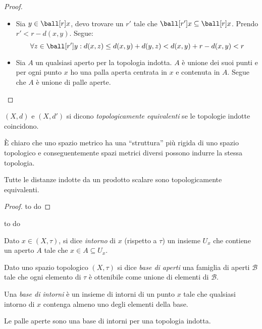 \begin{proof}\noindent
\begin{itemize}
\item Sia $y \in \ball[r]x$, devo trovare un $r'$ tale che $\ball[r']x \subseteq \ball[r]x$. Prendo $r' < r-d(x,y)$. Segue:
\[\forall z \in \ball[r']y: d(x,z) \le d(x,y) + d(y,z) < d(x,y)  + r - d(x,y) < r\]
\item Sia $A$ un qualsiasi aperto per la topologia indotta. $A$ è unione dei suoi punti e per ogni punto $x$ ho una palla aperta centrata in $x$ e contenuta in $A$. Segue che $A$ è unione di palle aperte.
\qedhere
\end{itemize}
\end{proof}

\begin{defn}
$(X,d)$ e $(X,d')$ si dicono \emph{topologicamente equivalenti} se le topologie indotte coincidono.
\end{defn}

\begin{oss}
È chiaro che uno spazio metrico ha una ``struttura'' più rigida di uno spazio topologico e conseguentemente spazi metrici diversi possono indurre la stessa topologia.
\end{oss}

\begin{teo}
Tutte le distanze indotte da un prodotto scalare sono topologicamente equivalenti.
\end{teo}

\begin{proof} 
to do
\end{proof}

\begin{es}
to do
\end{es}

\begin{defn}[Intorno]
Dato $x \in (X,\tau)$, si dice \emph{intorno} di $x$ (rispetto a $\tau$) un insieme $U_x$ che contiene un aperto $A$ tale che $x \in A \subseteq U_x$.
\end{defn}

\begin{defn}
Dato uno spazio topologico $(X,\tau)$ si dice \emph{base di aperti} una famiglia di aperti $\mathcal B$ tale che ogni elemento di $\tau$ è ottenibile come unione di elementi di $\mathcal B$.
\end{defn}

\begin{defn}
Una \emph{base di intorni} è un insieme di intorni di un punto $x$ tale che qualsiasi intorno di $x$ contenga almeno uno degli elementi della base.
\end{defn}

\begin{oss}
Le palle aperte sono una base di intorni per una topologia indotta.
\end{oss}